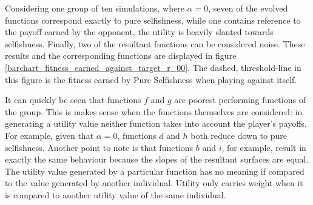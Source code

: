 \documentclass[11pt]{book}
\newcommand*{\np}{\par\noindent\newline}
\begin{document}
\np Considering one group of ten simulations, where $\alpha = 0$, seven of the evolved functions correspond exactly to pure selfishness,
while one contains reference to the payoff earned by the opponent, the utility is heavily slanted towards selfishness.
Finally, two of the resultant functions can be considered noise.
These results and the corresponding functions are displayed in figure \ref{barchart_fitness_earned_against_target_r_00}.
The dashed, threshold-line in this figure is the fitness earned by Pure Selfishness when playing against itself.

\np It can quickly be seen that functions $f$ and $g$ are poorest performing functions of the group.
This is makes sense when the functions themselves are considered: in generating a utility value neither function takes into account the player's payoffs.
For example, given that $\alpha=0$, functions $d$ and $h$ both reduce down to pure selfishness.
Another point to note is that functions $b$ and $i$, for example, result in exactly the same behaviour because the slopes of the resultant surfaces are equal.
The utility value generated by a particular function has no meaning if compared to the value generated by another individual.
Utility only carries weight when it is compared to another utility value of the same individual. 
\end{document}
